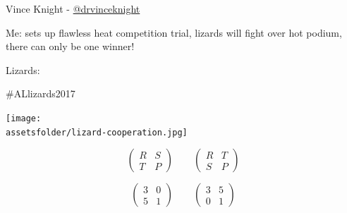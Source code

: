 \documentclass{beamer}
\newcommand{\assetsfolder}{./assets}
\begin{document}
    \begin{frame}
        \begin{center}
            \Huge
               Vince Knight - \href{https://twitter.com/drvinceknight}{@drvinceknight}\\
        \end{center}
    \end{frame}

    \begin{frame}
        \begin{center}
            \begin{tcolorbox}[colback=twitter,colframe=twitter!40!black,title=
                    \href{https://twitter.com/kirstyjean/status/870415613746962432}
                    {@kirstyjean} (2 Jun 2017):
]
                    Me: sets up flawless heat competition trial, lizards will
                    fight over hot podium, there can only be one winner!

                    Lizards:

                    \#ALlizards2017
           \end{tcolorbox}
        \end{center}
        \begin{center}
            \pause
            \texttt{[image: \\assetsfolder/lizard-cooperation.jpg]}
        \end{center}

    \end{frame}

    \begin{frame}
        \Huge
        \[
            \begin{pmatrix}
                R & S\\
                T & P
            \end{pmatrix}
            \qquad
            \begin{pmatrix}
                R & T\\
                S & P
            \end{pmatrix}
        \]
    \end{frame}

    \begin{frame}
        \Huge
        \[
            \begin{pmatrix}
                3 & 0\\
                5 & 1
            \end{pmatrix}
            \qquad
            \begin{pmatrix}
                3 & 5\\
                0 & 1
            \end{pmatrix}
        \]
    \end{frame}
\end{document}
